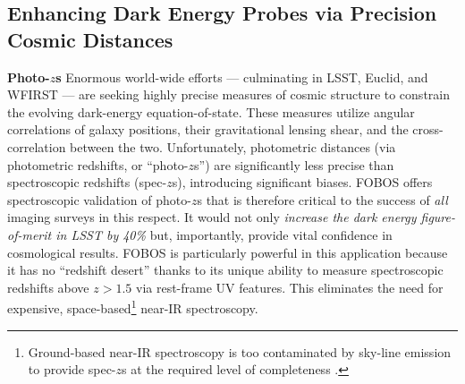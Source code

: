 
\subsection{Enhancing Dark Energy Probes via Precision Cosmic Distances}
\label{sec:cosmology}

\noindent \textbf{Photo-$z$s} Enormous world-wide efforts --- culminating in
LSST, Euclid, and WFIRST --- are seeking highly precise measures of cosmic
structure to constrain the evolving dark-energy equation-of-state. These measures utilize angular correlations of galaxy positions, their
gravitational lensing shear, and the cross-correlation between the two.
Unfortunately, photometric distances (via photometric redshifts, or
``photo-$z$s'') are significantly less precise than spectroscopic
redshifts (spec-$z$s), introducing significant biases.  FOBOS offers
spectroscopic validation of photo-$z$s that is 
therefore critical to the success of {\it all} imaging surveys in this
respect. It would not only \emph{increase the dark energy
figure-of-merit in LSST by 40\%} \citep{newman15} but, importantly,
provide vital confidence in cosmological results.  FOBOS is particularly
powerful in this application because it has no ``redshift desert'' thanks to its unique ability to measure spectroscopic redshifts above $z > 1.5$ via
rest-frame UV features.  This eliminates the need for expensive, space-based\footnote{Ground-based near-IR
spectroscopy is too contaminated by sky-line emission to provide spec-$z$s at the required level of completeness
\citep{newman15}.} near-IR spectroscopy.

\noindent{}

\noindent{}